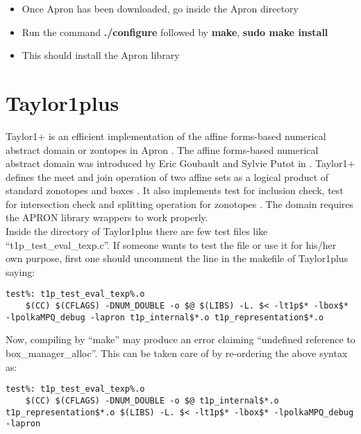 \documentclass[a4paper]{article}
\begin{document}
\begin{itemize}
\item Once Apron has been downloaded, go inside the Apron directory
\item Run the command \textbf{./configure} followed by \textbf{make}, \textbf{sudo make install}
\item This should install the Apron library
\end{itemize}

\section{Taylor1plus}
Taylor1+ is an efficient implementation of the affine forms-based numerical abstract domain or zontopes in Apron \cite{taylor1}. The affine forms-based numerical abstract domain was introduced by Eric Goubault and Sylvie Putot in \cite{affineabstract}. Taylor1+ defines the meet and join operation of two affine sets as a logical product of standard zonotopes and boxes \cite{meet}. It also implements test for inclusion check, test for intersection check and splitting operation for zonotopes \cite{split}. The domain requires the APRON library wrappers to work properly. \\
\indent Inside the directory of Taylor1plus there are few test files like ``t1p\_test\_eval\_texp.c''. If someone wants to test the file or use it for his/her own purpose, first one should uncomment the line in the makefile of Taylor1plus saying:
\begin{verbatim}
test%: t1p_test_eval_texp%.o 
	$(CC) $(CFLAGS) -DNUM_DOUBLE -o $@ $(LIBS) -L. $< -lt1p$* -lbox$* 
-lpolkaMPQ_debug -lapron t1p_internal$*.o t1p_representation$*.o 
\end{verbatim}
Now, compiling by ``make'' may produce an error claiming ``undefined reference to box\_manager\_alloc''. This can be taken care of by re-ordering the above syntax as:
\begin{verbatim}
test%: t1p_test_eval_texp%.o 
	$(CC) $(CFLAGS) -DNUM_DOUBLE -o $@ t1p_internal$*.o 
t1p_representation$*.o $(LIBS) -L. $< -lt1p$* -lbox$* -lpolkaMPQ_debug -lapron 
\end{verbatim}
\end{document}

